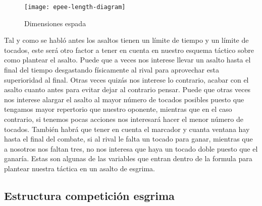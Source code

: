 \begin{figure}[htb]
	\centering
	\texttt{[image: epee-length-diagram]}
	\caption[Dimensiones espada]{Dimensiones espada}
	\label{epee-length-diagram}
\end{figure}

Tal y como se habló antes los asaltos tienen un límite de tiempo y un límite de tocados,
 este será otro factor a tener en cuenta en nuestro esquema táctico sobre como plantear el asalto.
 Puede que a veces nos interese llevar un asalto hasta el final del tiempo desgastando físicamente al
 rival para aprovechar esta superioridad al final. Otras veces quizás nos interese lo contrario,
 acabar con el asalto cuanto antes para evitar dejar al contrario pensar. Puede que otras veces nos
 interese alargar el asalto al mayor número de tocados posibles puesto que tengamos mayor
 repertorio que nuestro oponente, mientras que en el caso contrario, si tenemos pocas acciones nos interesará
 hacer el menor número de tocados. También habrá que tener en cuenta el marcador y cuanta ventana hay
 hasta el final del combate, si al rival le falta un tocado para ganar, mientras que a nosotros nos faltan
 tres, no nos interesa que haya un tocado doble puesto que el ganaría. Estas son algunas de las variables
 que entran dentro de la formula para plantear nuestra táctica en un asalto de esgrima.

\subsection{Estructura competición esgrima}

